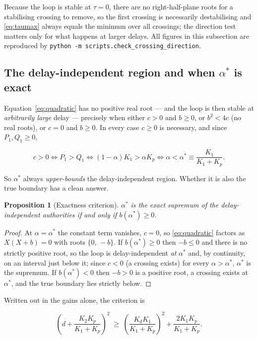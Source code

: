 \documentclass[11pt,a4paper]{article}
\newcommand{\astar}{\alpha^{*}}
\theoremstyle{plain}
\newtheorem{proposition}{Proposition}
\theoremstyle{definition}
\begin{document}
Because the loop is stable at $\tau = 0$, there are no right-half-plane
roots for a stabilising crossing to remove, so the first crossing is
necessarily destabilising and \eqref{eq:taumax} always equals the
minimum over all crossings; the direction test matters only for what
happens at larger delays. All figures in this subsection are reproduced by
\texttt{python -m scripts.check\_crossing\_direction}.

\subsection{The delay-independent region and when \texorpdfstring{$\astar$}{alpha*} is exact}
\label{sec:alphastar}

Equation~\eqref{eq:quadratic} has no positive real root --- and the loop
is then stable at \emph{arbitrarily large} delay --- precisely when
either $c > 0$ and $b \ge 0$, or $b^2 < 4c$ (no real roots), or $c = 0$
and $b \ge 0$. In every case $c \ge 0$ is necessary, and since
$P_1, Q_1 \ge 0$,

\begin{equation}
c > 0
\iff P_1 > Q_1
\iff (1-\alpha)K_1 > \alpha K_p
\iff \alpha < \astar \equiv \frac{K_1}{K_1 + K_p}.
\label{eq:alphastar}
\end{equation}

So $\astar$ always \emph{upper-bounds} the delay-independent region.
Whether it is also the true boundary has a clean answer.

\begin{proposition}[Exactness criterion]
$\astar$ is the exact supremum of the delay-independent authorities if
and only if $b(\astar) \ge 0$.
\end{proposition}

\begin{proof}
At $\alpha = \astar$ the constant term vanishes, $c = 0$, so
\eqref{eq:quadratic} factors as $X(X + b) = 0$ with roots
$\{0,\, -b\}$. If $b(\astar) \ge 0$ then $-b \le 0$ and there is no
strictly positive root, so the loop is delay-independent \emph{at}
$\astar$ and, by continuity, on an interval just below it; since $c < 0$
(a crossing exists) for every $\alpha > \astar$, $\astar$ is the
supremum. If $b(\astar) < 0$ then $-b > 0$ is a positive root, a
crossing exists at $\astar$, and the true boundary lies strictly below.
\end{proof}

Written out in the gains alone, the criterion is

\begin{equation}
\left(d + \frac{K_2 K_p}{K_1 + K_p}\right)^{2}
\;\ge\;
\left(\frac{K_d K_1}{K_1 + K_p}\right)^{2}
+ \frac{2 K_1 K_p}{K_1 + K_p}.
\label{eq:criterion}
\end{equation}
\end{document}
